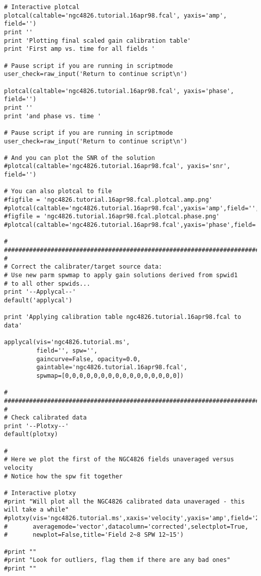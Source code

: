 \begin{verbatim}
# Interactive plotcal
plotcal(caltable='ngc4826.tutorial.16apr98.fcal', yaxis='amp', field='')
print ''
print 'Plotting final scaled gain calibration table'
print 'First amp vs. time for all fields '
        
# Pause script if you are running in scriptmode
user_check=raw_input('Return to continue script\n')

plotcal(caltable='ngc4826.tutorial.16apr98.fcal', yaxis='phase', field='')
print ''
print 'and phase vs. time '

# Pause script if you are running in scriptmode
user_check=raw_input('Return to continue script\n')

# And you can plot the SNR of the solution
#plotcal(caltable='ngc4826.tutorial.16apr98.fcal', yaxis='snr', field='')

# You can also plotcal to file
#figfile = 'ngc4826.tutorial.16apr98.fcal.plotcal.amp.png'
#plotcal(caltable='ngc4826.tutorial.16apr98.fcal',yaxis='amp',field='',showgui=False,figfile=figfile)
#figfile = 'ngc4826.tutorial.16apr98.fcal.plotcal.phase.png'
#plotcal(caltable='ngc4826.tutorial.16apr98.fcal',yaxis='phase',field='',showgui=False,figfile=figfile)

#
##########################################################################
#
# Correct the calibrater/target source data:
# Use new parm spwmap to apply gain solutions derived from spwid1
# to all other spwids... 
print '--Applycal--'
default('applycal')

print 'Applying calibration table ngc4826.tutorial.16apr98.fcal to data'

applycal(vis='ngc4826.tutorial.ms',
         field='', spw='',
         gaincurve=False, opacity=0.0, 
         gaintable='ngc4826.tutorial.16apr98.fcal',
         spwmap=[0,0,0,0,0,0,0,0,0,0,0,0,0,0,0,0])

#
##########################################################################
#
# Check calibrated data
print '--Plotxy--'
default(plotxy)

#
# Here we plot the first of the NGC4826 fields unaveraged versus velocity
# Notice how the spw fit together

# Interactive plotxy
#print "Will plot all the NGC4826 calibrated data unaveraged - this will take a while"
#plotxy(vis='ngc4826.tutorial.ms',xaxis='velocity',yaxis='amp',field='2~8',spw='12~15',
#       averagemode='vector',datacolumn='corrected',selectplot=True,
#       newplot=False,title='Field 2~8 SPW 12~15')

#print ""
#print "Look for outliers, flag them if there are any bad ones"
#print ""
        

\end{verbatim}
